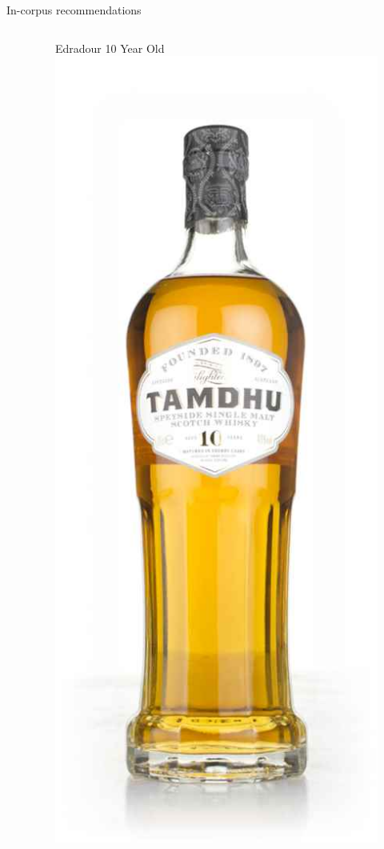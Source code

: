\documentclass{beamer}
\begin{document}
\begin{frame}{In-corpus recommendations}
\begin{columns}
\begin{column}{0.5\textwidth}
		\end{column}
		\begin{column}{0.5\textwidth}
			\begin{figure}
				\begin{center}
					Edradour 10 Year Old
					\includegraphics[scale = 0.2]{tamdhu10}
				\end{center}
			\end{figure}
		\end{column}
	\end{columns}
	
	
	
\end{frame}
\end{document}
